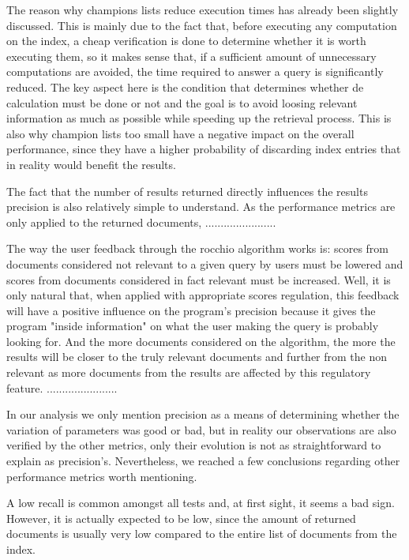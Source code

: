 \documentclass[12pt]{article}
\begin{document}
The reason why champions lists reduce execution times has already been slightly 
discussed. 
This is mainly due to the fact that, before executing any computation on the index,
a cheap verification is done to determine whether it is worth executing them, so
it makes sense that, if a sufficient amount of unnecessary computations are avoided,
the time required to answer a query is significantly reduced.
The key aspect here is the condition that determines whether de calculation must 
be done or not and the goal is to avoid loosing relevant information as much as
possible while speeding up the retrieval process.
This is also why champion lists too small have a negative impact on the overall 
performance, since they have a higher probability of discarding index entries 
that in reality would benefit the results.

The fact that the number of results returned directly influences the results 
precision is also relatively simple to understand.
As the performance metrics are only applied to the returned documents, 
.......................

The way the user feedback through the rocchio algorithm works is: scores from 
documents considered not relevant to a given query by users must be lowered and 
scores from documents considered in fact relevant must be increased.
Well, it is only natural that, when applied with appropriate scores regulation,
this feedback will have a positive influence on the program's precision because
it gives the program "inside information" on what the user making the query is
probably looking for.
And the more documents considered on the algorithm, the more the results will 
be closer to the truly relevant documents and further from the non relevant as 
more documents from the results are affected by this regulatory feature.
.......................

In our analysis we only mention precision as a means of determining whether 
the variation of parameters was good or bad, but in reality our observations 
are also verified by the other metrics, only their evolution is not as 
straightforward to explain as precision's.
Nevertheless, we reached a few conclusions regarding other performance metrics
worth mentioning.

A low recall is common amongst all tests and, at first sight, it seems a bad sign.
However, it is actually expected to be low, since the amount of returned documents
is usually very low compared to the entire list of documents from the index.
\end{document}
